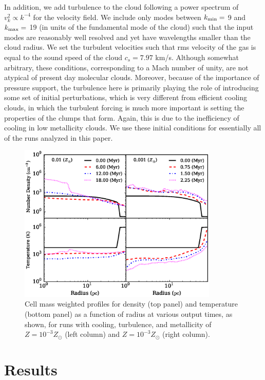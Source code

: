 \documentclass[useAMS,usenatbib]{mn2e}
\begin{document}
In addition, we add turbulence to the cloud following a power spectrum of
$v_k^2 \propto k^{-4}$ for the velocity field.  We include only modes between
$k_{\rm min}=$ 9 and $k_{\rm max} =$ 19 (in units of the fundamental mode of
the cloud) such that the input modes are reasonably well resolved
and yet have wavelengths smaller than the cloud radius.  We set the turbulent velocities
such that rms velocity of the gas is equal to the sound speed of the cloud $c_s = 7.97$ km/s.
Although somewhat arbitrary, these conditions, corresponding to a Mach number
of unity, are not atypical of present day molecular clouds.  Moreover, because of
the importance of pressure support, the turbulence here is primarily playing the role
of introducing some set of initial perturbations, which is very different from efficient
cooling clouds, in which the turbulent forcing is much more important is setting
the properties of the clumps that form.  Again, this is due to the inefficiency of cooling
in low metallicity clouds.
We use these initial conditions for essentially all of the runs analyzed in this paper.


% 


\begin{figure}
\begin{center}
\includegraphics[width=9.5cm]{Images/profile_panel}
\end{center}
\caption{\label{fig:profiles} Cell mass weighted profiles for 
density (top panel) and temperature (bottom panel) as a function of radius at various 
output times, as shown, for runs with cooling, turbulence, and metallicity of $Z=10^{-3}Z_\odot$
(left column) and $Z=10^{-3}Z_\odot$ (right column).}
\end{figure}

\section{Results}
\label{sec:results}
\end{document}
